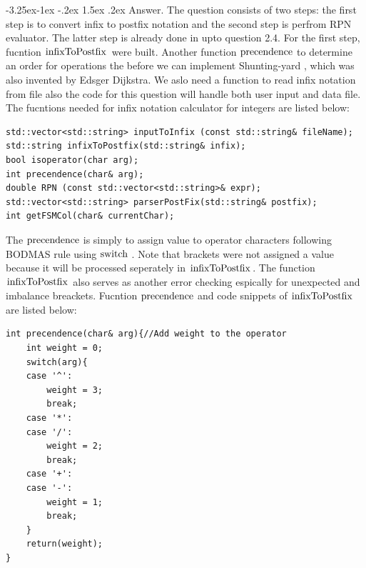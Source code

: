\documentclass[a4paper,12pt]{article}%
\makeatletter
\renewcommand\subsubsection{\@startsection{subsection}{2}{\z@}%
                                     {-3.25ex\@plus -1ex \@minus -.2ex}%
                                     {1.5ex \@plus .2ex}%
                                     {\normalfont\bfseries\itshape}}%
\makeatother
\begin{document}
\subsubsection{Answer.}
The question consists of two steps: the first step is to convert infix to postfix notation and the second step is perfrom RPN evaluator. The latter step is already done in upto question 2.4. For the first step, fucntion $\lstinline{infixToPostfix}$ were built. Another function $\lstinline{precendence}$ to determine an order for operations the before we can implement Shunting-yard \cite[]{kushwaha2014}, which was also invented by Edsger Dijkstra. We aslo need a function to read infix notation from file also the code for this question will handle both user input and data file. The fucntions needed for infix notation calculator for integers are listed below:
\begin{lstlisting}
std::vector<std::string> inputToInfix (const std::string& fileName);
std::string infixToPostfix(std::string& infix); 
bool isoperator(char arg);
int precendence(char& arg);
double RPN (const std::vector<std::string>& expr);
std::vector<std::string> parserPostFix(std::string& postfix);
int getFSMCol(char& currentChar); 
\end{lstlisting}
The $\lstinline{precendence}$ is simply to assign value to operator characters following BODMAS rule using $\lstinline{switch}$ . Note that brackets were not assigned a value because it will be processed seperately in $\lstinline{infixToPostfix}$. The function $\lstinline{infixToPostfix}$ also serves as another error checking espically for unexpected and imbalance breackets. Fucntion $\lstinline{precendence}$ and code snippets of $\lstinline{infixToPostfix}$ are listed below:
\begin{lstlisting}[title = $\lstinline{precendence}$]
int precendence(char& arg){//Add weight to the operator
    int weight = 0;
    switch(arg){
    case '^':
        weight = 3;
        break;
    case '*':
    case '/':
        weight = 2;
        break;
    case '+':
    case '-':
        weight = 1;
        break;
    }
    return(weight);
}
\end{lstlisting}
\end{document}

